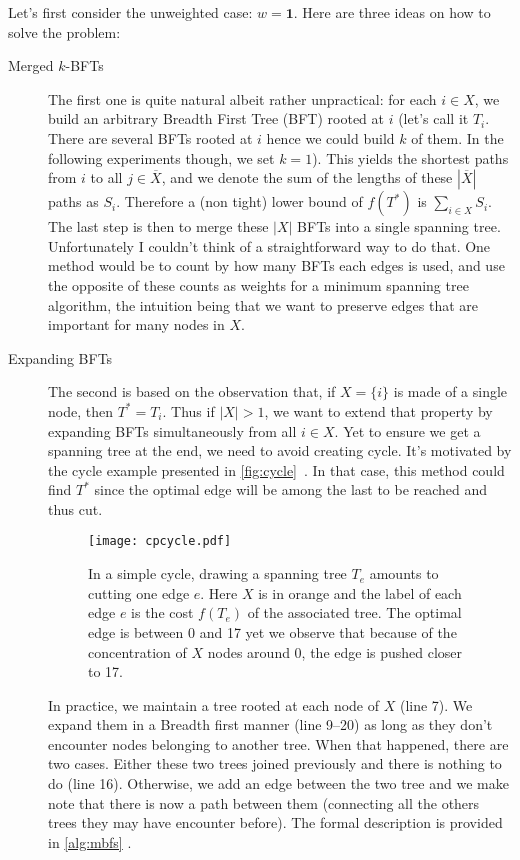 \documentclass[a4paper,final,notitlepage,11pt,svgnames]{scrartcl}
\newcommand{\stcomp}[1]{\ensuremath{\overline{#1}}}
\begin{document}
Let's first consider the unweighted case: $w=\boldsymbol{1}$. Here are three
ideas on how to solve the problem:
\begin{description}

	\item[Merged $k$-BFTs] The first one is quite natural albeit rather
		unpractical: for each $i \in X$, we build an arbitrary Breadth First
		Tree (BFT) rooted at $i$ (let's call it $T_i$. There are several BFTs
		rooted at $i$ hence we could build $k$ of them. In the following
		experiments though, we set $k=1$). This yields the shortest paths from
		$i$ to all $j \in \stcomp{X}$, and we denote the sum of the lengths of
		these $|\stcomp{X}|$ paths as $S_i$. Therefore a (non tight) lower
		bound of $f(T^*)$ is $\sum_{i\in X} S_i$. The last step is then to
		merge these $|X|$ BFTs into a single spanning tree. Unfortunately I
		couldn't think of a straightforward way to do that. One method would be
		to count by how many BFTs each edges is used, and use the opposite of
		these counts as weights for a minimum spanning tree algorithm, the
		intuition being that we want to preserve edges that are important for
		many nodes in $X$.

	\item[Expanding BFTs] The second is based on the observation that, if $X =
		\{i\}$ is made of a single node, then $T^* = T_i$. Thus if $|X| > 1$,
		we want to extend that property by expanding BFTs simultaneously from
		all $i \in X$. Yet to ensure we get a spanning tree at the end, we need
		to avoid creating cycle. It's motivated by the cycle example presented
		in \autoref{fig:cycle}~. In that case, this method
		could find $T^*$ since the optimal edge will be among the last to be
		reached and thus cut.

		\begin{figure}[hbp]
			\centering
			\texttt{[image: cpcycle.pdf]}
			\caption{In a simple cycle, drawing a spanning tree $T_e$ amounts
				to cutting one edge $e$. Here $X$ is in orange and the label of
				each edge $e$ is the cost $f(T_e)$ of the associated tree. The
				optimal edge is between 0 and 17 yet we observe that because of
				the concentration of $X$ nodes around 0, the edge is pushed
				closer to 17. \label{fig:cycle}}
		\end{figure}

		In practice, we maintain a tree rooted at each node of $X$ (line 7).
		We expand them in a Breadth first manner (line 9--20) as long as they
		don't encounter nodes belonging to another tree. When that happened,
		there are two cases. Either these two trees joined previously and there
		is nothing to do (line 16). Otherwise, we add an edge between the two
		tree and we make note that there is now a path between them (connecting
		all the others trees they may have encounter before).  The formal
		description is provided in \autoref{alg:mbfs} .


\end{description}
\end{document}
